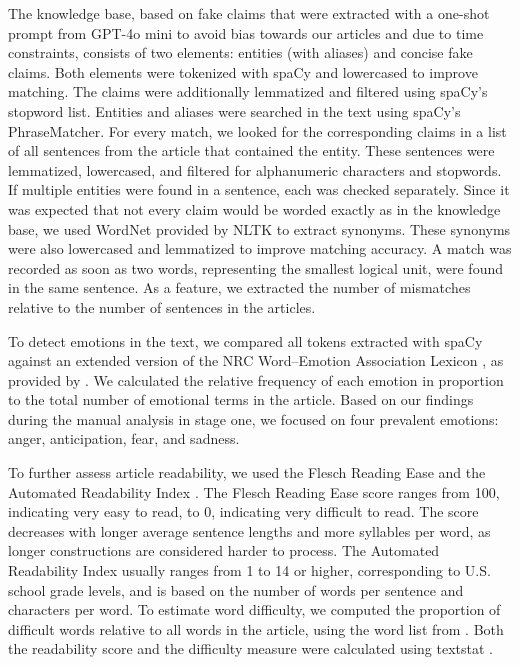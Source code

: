 \documentclass[12pt,a4paper,twocolumn]{article}
\begin{document}
The knowledge base, based on fake claims that were extracted with a one-shot prompt from GPT-4o mini to avoid bias towards our articles and due to time constraints, consists of two elements: entities (with aliases) and concise fake claims. Both elements were tokenized with spaCy and lowercased to improve matching. The claims were additionally lemmatized and filtered using spaCy’s stopword list. Entities and aliases were searched in the text using spaCy’s PhraseMatcher. For every match, we looked for the corresponding claims in a list of all sentences from the article that contained the entity. These sentences were lemmatized, lowercased, and filtered for alphanumeric characters and stopwords. If multiple entities were found in a sentence, each was checked separately. Since it was expected that not every claim would be worded exactly as in the knowledge base, we used WordNet provided by NLTK \citep{NLTK} to extract synonyms. These synonyms were also lowercased and lemmatized to improve matching accuracy. A match was recorded as soon as two words, representing the smallest logical unit, were found in the same sentence. As a feature, we extracted the number of mismatches relative to the number of sentences in the articles.

To detect emotions in the text, we compared all tokens extracted with spaCy against an extended version of the NRC Word–Emotion Association Lexicon \citep{emotions}, as provided by \citet{NRClex}. We calculated the relative frequency of each emotion in proportion to the total number of emotional terms in the article. Based on our findings during the manual analysis in stage one, we focused on four prevalent emotions: anger, anticipation, fear, and sadness.

To further assess article readability, we used the Flesch Reading Ease \citep{flesch} and the Automated Readability Index \citep{senter_smith_1967}. The Flesch Reading Ease score ranges from 100, indicating very easy to read, to 0, indicating very difficult to read. The score decreases with longer average sentence lengths and more syllables per word, as longer constructions are considered harder to process. The Automated Readability Index usually ranges from 1 to 14 or higher, corresponding to U.S. school grade levels, and is based on the number of words per sentence and characters per word. To estimate word difficulty, we computed the proportion of difficult words relative to all words in the article, using the word list from \citet{chall1995readability}. Both the readability score and the difficulty measure were calculated using textstat \citep{textstat}.
\end{document}
